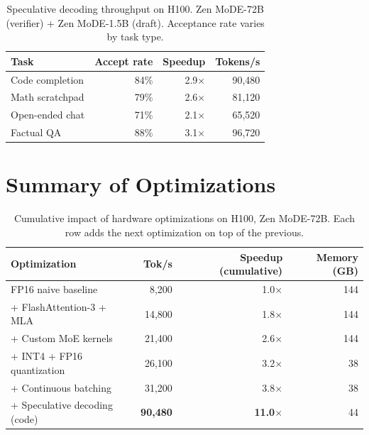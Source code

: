 \documentclass[11pt,a4paper]{article}
\begin{document}
\begin{table}[H]
\centering
\caption{Speculative decoding throughput on H100. Zen MoDE-72B (verifier) + Zen MoDE-1.5B
(draft). Acceptance rate varies by task type.}
\begin{tabular}{lrrr}
\toprule
\textbf{Task} & \textbf{Accept rate} & \textbf{Speedup} & \textbf{Tokens/s} \\
\midrule
Code completion     & 84\% & 2.9$\times$ & 90,480 \\
Math scratchpad     & 79\% & 2.6$\times$ & 81,120 \\
Open-ended chat     & 71\% & 2.1$\times$ & 65,520 \\
Factual QA          & 88\% & 3.1$\times$ & 96,720 \\
\bottomrule
\end{tabular}
\label{tab:speculative}
\end{table}

\section{Summary of Optimizations}
\label{sec:summary}

\begin{table}[H]
\centering
\caption{Cumulative impact of hardware optimizations on H100, Zen MoDE-72B.
Each row adds the next optimization on top of the previous.}
\begin{tabular}{lrrr}
\toprule
\textbf{Optimization} & \textbf{Tok/s} & \textbf{Speedup (cumulative)} & \textbf{Memory (GB)} \\
\midrule
FP16 naive baseline           & 8,200  & 1.0$\times$ & 144 \\
+ FlashAttention-3 + MLA      & 14,800 & 1.8$\times$ & 144 \\
+ Custom MoE kernels          & 21,400 & 2.6$\times$ & 144 \\
+ INT4 + FP16 quantization    & 26,100 & 3.2$\times$ & 38  \\
+ Continuous batching         & 31,200 & 3.8$\times$ & 38  \\
+ Speculative decoding (code) & \textbf{90,480} & \textbf{11.0$\times$} & 44 \\
\bottomrule
\end{tabular}
\label{tab:cumulative}
\end{table}

\end{document}
